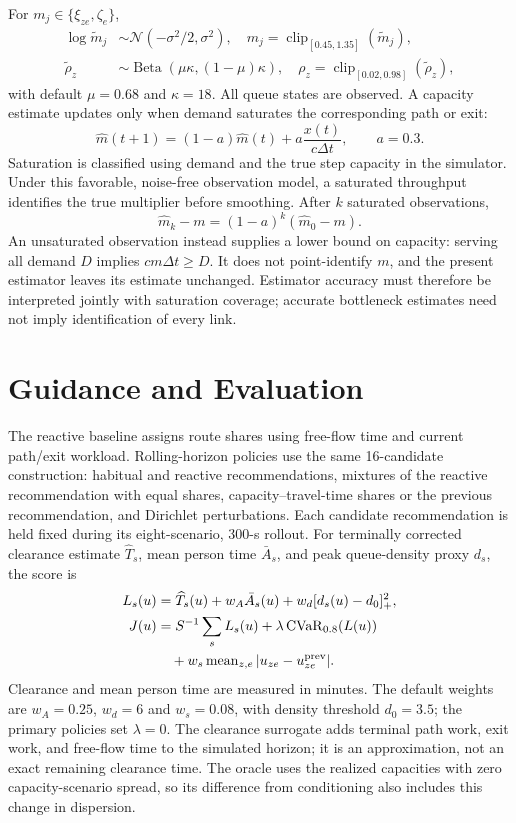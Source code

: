 \documentclass[conference]{IEEEtran}
\newcommand{\CVaR}{\operatorname{CVaR}}
\begin{document}
For $m_j\in\{\xi_{ze},\zeta_e\}$,
\begin{align}
\log \widetilde m_j&\sim\mathcal N(-\sigma^2/2,\sigma^2),\quad
m_j=\operatorname{clip}_{[0.45,1.35]}(\widetilde m_j),\\
\widetilde\rho_z&\sim\operatorname{Beta}(\mu\kappa,(1-\mu)\kappa),\quad
\rho_z=\operatorname{clip}_{[0.02,0.98]}(\widetilde\rho_z),
\label{eq:uncertainty}
\end{align}
with default $\mu=0.68$ and $\kappa=18$. All queue states are observed. A capacity estimate updates only when demand saturates the corresponding path or exit:
\begin{equation}
\widehat m(t+1)=(1-a)\widehat m(t)+a\frac{x(t)}{c\Delta t},\qquad a=0.3.
\label{eq:estimate}
\end{equation}
Saturation is classified using demand and the true step capacity in the simulator. Under this favorable, noise-free observation model, a saturated throughput identifies the true multiplier before smoothing. After $k$ saturated observations,
\begin{equation}
\widehat m_k-m=(1-a)^k(\widehat m_0-m).
\label{eq:convergence}
\end{equation}
An unsaturated observation instead supplies a lower bound on capacity: serving all demand $D$ implies $c m\Delta t\geq D$. It does not point-identify $m$, and the present estimator leaves its estimate unchanged. Estimator accuracy must therefore be interpreted jointly with saturation coverage; accurate bottleneck estimates need not imply identification of every link.

\section{Guidance and Evaluation}
The reactive baseline assigns route shares using free-flow time and current path/exit workload. Rolling-horizon policies use the same 16-candidate construction: habitual and reactive recommendations, mixtures of the reactive recommendation with equal shares, capacity--travel-time shares or the previous recommendation, and Dirichlet perturbations. Each candidate recommendation is held fixed during its eight-scenario, 300-s rollout. For terminally corrected clearance estimate $\widehat T_s$, mean person time $\bar A_s$, and peak queue-density proxy $d_s$, the score is
\begin{align}
L_s(u)&=\widehat T_s(u)+w_A\bar A_s(u)+w_d[d_s(u)-d_0]_+^2,\\
J(u)&=S^{-1}\sum_s L_s(u)+\lambda\CVaR_{0.8}(L(u))\notag\\
&\quad+w_s\operatorname{mean}_{z,e}|u_{ze}-u^{\rm prev}_{ze}|.
\label{eq:objective}
\end{align}
Clearance and mean person time are measured in minutes. The default weights are $w_A=0.25$, $w_d=6$ and $w_s=0.08$, with density threshold $d_0=3.5$; the primary policies set $\lambda=0$. The clearance surrogate adds terminal path work, exit work, and free-flow time to the simulated horizon; it is an approximation, not an exact remaining clearance time. The oracle uses the realized capacities with zero capacity-scenario spread, so its difference from conditioning also includes this change in dispersion.
\end{document}
